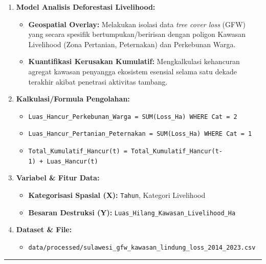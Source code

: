 \documentclass[
]{article}
\providecommand{\tightlist}{%
  \setlength{\itemsep}{0pt}\setlength{\parskip}{0pt}}
\begin{document}
\begin{enumerate}
\def\labelenumi{\arabic{enumi}.}
\tightlist
\item
  \textbf{Model Analisis Deforestasi Livelihood:}

  \begin{itemize}
  \tightlist
  \item
    \textbf{Geospatial Overlay:} Melakukan isolasi data \emph{tree cover
    loss} (GFW) yang secara spesifik bertumpukan/beririsan dengan
    poligon Kawasan Livelihood (Zona Pertanian, Peternakan) dan
    Perkebunan Warga.
  \item
    \textbf{Kuantifikasi Kerusakan Kumulatif:} Mengkalkulasi kehancuran
    agregat kawasan penyangga ekosistem esensial selama satu dekade
    terakhir akibat penetrasi aktivitas tambang.
  \end{itemize}
\item
  \textbf{Kalkulasi/Formula Pengolahan:}

  \begin{itemize}
  \tightlist
  \item
    \texttt{Luas\_Hancur\_Perkebunan\_Warga\ =\ SUM(Loss\_Ha)\ WHERE\ Cat\ =\ \textquotesingle{}2\textquotesingle{}}
  \item
    \texttt{Luas\_Hancur\_Pertanian\_Peternakan\ =\ SUM(Loss\_Ha)\ WHERE\ Cat\ =\ \textquotesingle{}1\textquotesingle{}}
  \item
    \texttt{Total\_Kumulatif\_Hancur(t)\ =\ Total\_Kumulatif\_Hancur(t-1)\ +\ Luas\_Hancur(t)}
  \end{itemize}
\item
  \textbf{Variabel \& Fitur Data:}

  \begin{itemize}
  \tightlist
  \item
    \textbf{Kategorisasi Spasial (X):} \texttt{Tahun}, Kategori
    Livelihood
  \item
    \textbf{Besaran Destruksi (Y):}
    \texttt{Luas\_Hilang\_Kawasan\_Livelihood\_Ha}
  \end{itemize}
\item
  \textbf{Dataset \& File:}

  \begin{itemize}
  \tightlist
  \item
    \texttt{data/processed/sulawesi\_gfw\_kawasan\_lindung\_loss\_2014\_2023.csv}
  \end{itemize}
\end{enumerate}

\begin{center}\rule{0.5\linewidth}{0.5pt}\end{center}
\end{document}
